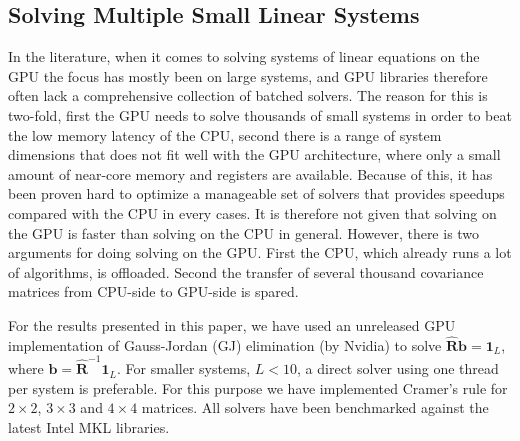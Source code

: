 \documentclass[journal]{IEEEtran}
\newcommand{\mat}[1]{\mathbf{#1}}
\renewcommand{\vec}[1]{\mathbf{#1}}
\begin{document}
\subsection{Solving Multiple Small Linear Systems}
In the literature, when it comes to solving systems of linear equations on the GPU the focus has mostly been on large systems, and GPU libraries therefore often lack a comprehensive collection of batched solvers. The reason for this is two-fold, first the GPU needs to solve thousands of small systems in order to beat the low memory latency of the CPU, second there is a range of system dimensions that does not fit well with the GPU architecture, where only a small amount of near-core memory and registers are available. Because of this, it has been proven hard to optimize a manageable set of solvers that provides speedups compared with the CPU in every cases. It is therefore not given that solving on the GPU is faster than solving on the CPU in general. However, there is two arguments for doing solving on the GPU. First the CPU, which already runs a lot of algorithms, is offloaded. Second the transfer of several thousand covariance matrices from CPU-side to GPU-side is spared.

For the results presented in this paper, we have used an unreleased GPU implementation of Gauss-Jordan (GJ) elimination (by Nvidia) to solve $\mat{\hat{R}}\vec{b} = \vec{1}_L$, where $\vec{b} = \mat{\hat{R}}^{-1}\vec{1}_L$. For smaller systems, $L < 10$, a direct solver using one thread per system is preferable. For this purpose we have implemented Cramer's rule for $2 \times 2$, $3 \times 3$ and $4 \times 4$ matrices. All solvers have been benchmarked against the latest Intel MKL libraries.




\end{document}
